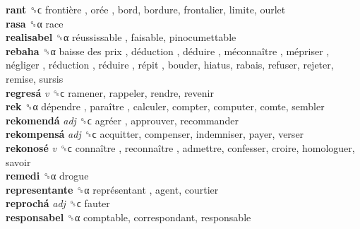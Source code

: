 \textbf{rant} ␝ϲ   frontière ,  orée , bord, bordure, frontalier, limite, ourlet  \\
\textbf{rasa} ␝α  race  \\
\textbf{realisabel} ␝α   réussissable , faisable, pinocumettable  \\
\textbf{rebaha} ␝α   baisse des prix ,  déduction ,  déduire ,  méconnaître ,  mépriser ,  négliger ,  réduction ,  réduire ,  répit , bouder, hiatus, rabais, refuser, rejeter, remise, sursis  \\
\textbf{regresá} \emph{v}  ␝ϲ  ramener, rappeler, rendre, revenir  \\
\textbf{rek} ␝α   dépendre ,  paraître , calculer, compter, computer, comte, sembler  \\
\textbf{rekomendá} \emph{adj}  ␝ϲ   agréer , approuver, recommander  \\
\textbf{rekompensá} \emph{adj}  ␝ϲ  acquitter, compenser, indemniser, payer, verser  \\
\textbf{rekonosé} \emph{v}  ␝ϲ   connaître ,  reconnaître , admettre, confesser, croire, homologuer, savoir  \\
\textbf{remedi} ␝α  drogue  \\
\textbf{representante} ␝α   représentant , agent, courtier  \\
\textbf{reprochá} \emph{adj}  ␝ϲ  fauter  \\
\textbf{responsabel} ␝α  comptable, correspondant, responsable  \\
